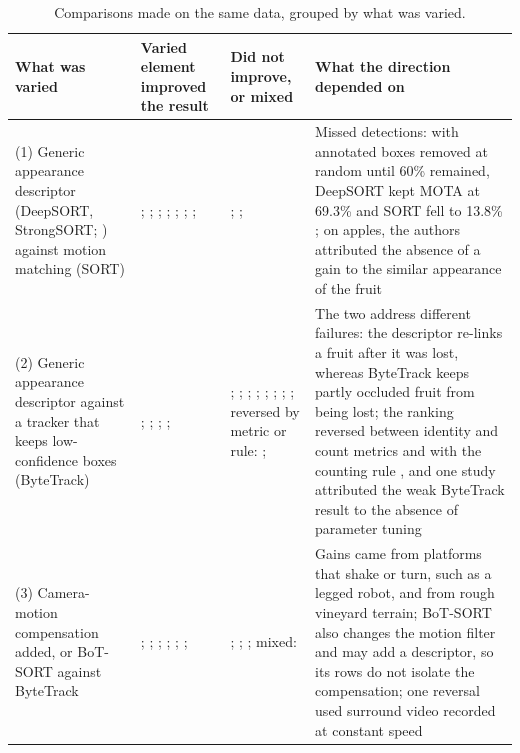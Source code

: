 \begin{table}[!t]
\centering
\caption{Comparisons made on the same data, grouped by what was varied.}\label{tab:assoc}
\footnotesize
\begin{tabularx}{\textwidth}{@{}L{3.1cm}L{3.5cm}L{3.0cm}Y@{}}
\toprule
What was varied & Varied element improved the result & Did not improve, or mixed & What the direction depended on\\
\midrule
(1) Generic appearance descriptor (DeepSORT, StrongSORT; \citealp{wojke2017simple,du2023strongsort}) against motion matching (SORT) & \citet{vaishnavi2025fruit}; \citet{si2026citrus}; \citet{villacres2023apple}; \citet{piazolo2026enhanced}; \citet{poncemachete2025optimizing}; \citet{an2024stratracker}; \citet{feng2026greenhouse}; \citet{zhai2025dynamic} & \citet{zhang2022deep}; \citet{genemola2023video}; \citet{weng2026citrus} & Missed detections: with annotated boxes removed at random until 60\% remained, DeepSORT kept MOTA at 69.3\% and SORT fell to 13.8\% \citep{villacres2023apple}; on apples, the authors attributed the absence of a gain to the similar appearance of the fruit \citep{genemola2023video}\\
\addlinespace
(2) Generic appearance descriptor against a tracker that keeps low-confidence boxes (ByteTrack) & \citet{pai2024maturity}; \citet{an2024stratracker}; \citet{piazolo2026enhanced}; \citet{zhou2024advancing}; \citet{zhai2025dynamic} & \citet{genemola2023video}; \citet{poncemachete2025optimizing}; \citet{sekharamantry2024seamless}; \citet{huang2026mfft}; \citet{wu2025maturity}; \citet{weng2026citrus}; \citet{felippomes2026video}; \citet{feng2026greenhouse}; reversed by metric or rule: \citet{qi2025assessment}; \citet{zhang2025row} & The two address different failures: the descriptor re-links a fruit after it was lost, whereas ByteTrack keeps partly occluded fruit from being lost; the ranking reversed between identity and count metrics \citep{qi2025assessment} and with the counting rule \citep{zhang2025row}, and one study attributed the weak ByteTrack result to the absence of parameter tuning \citep{zhou2024advancing}\\
\addlinespace
(3) Camera-motion compensation added, or BoT-SORT against ByteTrack & \citet{zhang2024stablesort}; \citet{saraceni2024agrisort}; \citet{huang2019high}; \citet{felippomes2026video}; \citet{kemper2025performance}; \citet{zhai2025dynamic}; \citet{an2024stratracker} & \citet{zhou2024utilizing}; \citet{weng2026citrus}; \citet{feng2026greenhouse}; mixed: \citet{wei2025multi} & Gains came from platforms that shake or turn, such as a legged robot, and from rough vineyard terrain; BoT-SORT also changes the motion filter and may add a descriptor, so its rows do not isolate the compensation; one reversal used surround video recorded at constant speed\\

\end{tabularx}
\end{table}
